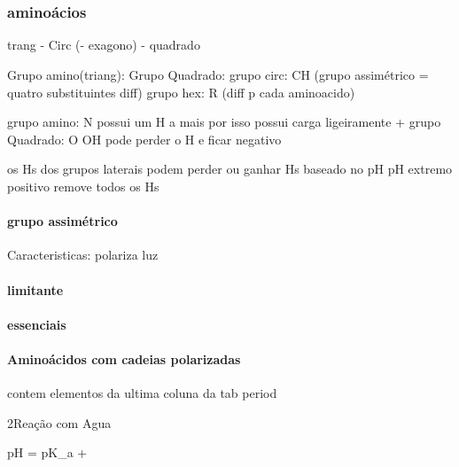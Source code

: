 \documentclass[\mainfilename]{subfiles}
\begin{document}





\part{}

\section{aminoácios}

trang - Circ (- exagono) - quadrado

Grupo amino(triang): 
Grupo Quadrado: 
grupo circ: CH (grupo assimétrico = quatro substituintes diff)
grupo hex: R (diff p cada aminoacido)

grupo amino: N possui um H a mais por isso possui carga ligeiramente +
grupo Quadrado: O OH pode perder o H e ficar negativo

os Hs dos grupos laterais podem perder ou ganhar Hs baseado no pH
pH extremo positivo remove todos os Hs

\subsection{grupo assimétrico}
Caracteristicas: polariza luz

\subsection{limitante}

\subsection{essenciais}

\subsection{Aminoácidos com cadeias polarizadas}
contem elementos da ultima coluna da tab period

\begin{sectionBox}2{Reação com Agua}
    

    \begin{BM}
        pH = pK_a + \log{}
    \end{BM}
    
\end{sectionBox}
\end{document}
